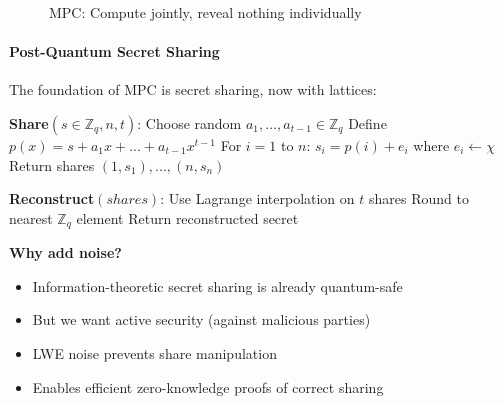 \documentclass[11pt,a4paper]{article}
\begin{document}
\begin{figure}[h]
\centering
{}
\caption{MPC: Compute jointly, reveal nothing individually}
\end{figure}

\paragraph{Post-Quantum Secret Sharing}

The foundation of MPC is secret sharing, now with lattices:

\begin{algorithm}
\caption{Lattice-Based Secret Sharing}
\label{alg:lattice-ss}
\begin{algorithmic}[1]
\State \textbf{Share}$(s \in \mathbb{Z}_q, n, t)$: 
\State \quad Choose random $a_1, ..., a_{t-1} \in \mathbb{Z}_q$
\State \quad Define $p(x) = s + a_1x + ... + a_{t-1}x^{t-1}$
\State \quad For $i = 1$ to $n$:
\State \quad \quad $s_i = p(i) + e_i$ where $e_i \leftarrow \chi$ 
\State \quad Return shares $(1, s_1), ..., (n, s_n)$

\State \textbf{Reconstruct}$(shares)$:
\State \quad Use Lagrange interpolation on $t$ shares
\State \quad Round to nearest $\mathbb{Z}_q$ element 
\State \quad Return reconstructed secret
\end{algorithmic}
\end{algorithm}

\textbf{Why add noise?}
\begin{itemize}
    \item Information-theoretic secret sharing is already quantum-safe
    \item But we want active security (against malicious parties)
    \item LWE noise prevents share manipulation
    \item Enables efficient zero-knowledge proofs of correct sharing
\end{itemize}
\end{document}
